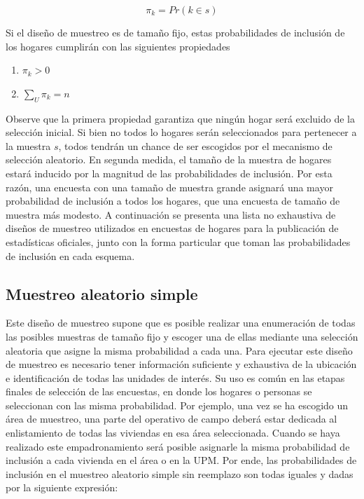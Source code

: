 \documentclass[
  12pt,
  spanish,
]{book}
\providecommand{\tightlist}{%
  \setlength{\itemsep}{0pt}\setlength{\parskip}{0pt}}
\begin{document}
\[\pi_k = Pr (k \in s)\]

Si el diseño de muestreo es de tamaño fijo, estas probabilidades de inclusión de los hogares cumplirán con las siguientes propiedades

\begin{enumerate}
\def\labelenumi{\arabic{enumi}.}
\tightlist
\item
  \(\pi_k > 0\)
\item
  \(\sum_U \pi_k = n\)
\end{enumerate}

Observe que la primera propiedad garantiza que ningún hogar será excluido de la selección inicial. Si bien no todos lo hogares serán seleccionados para pertenecer a la muestra \(s\), todos tendrán un chance de ser escogidos por el mecanismo de selección aleatorio. En segunda medida, el tamaño de la muestra de hogares estará inducido por la magnitud de las probabilidades de inclusión. Por esta razón, una encuesta con una tamaño de muestra grande asignará una mayor probabilidad de inclusión a todos los hogares, que una encuesta de tamaño de muestra más modesto. A continuación se presenta una lista no exhaustiva de diseños de muestreo utilizados en encuestas de hogares para la publicación de estadísticas oficiales, junto con la forma particular que toman las probabilidades de inclusión en cada esquema.

\hypertarget{muestreo-aleatorio-simple}{%
\subsection*{Muestreo aleatorio simple}\label{muestreo-aleatorio-simple}}

Este diseño de muestreo supone que es posible realizar una enumeración de todas las posibles muestras de tamaño fijo y escoger una de ellas mediante una selección aleatoria que asigne la misma probabilidad a cada una. Para ejecutar este diseño de muestreo es necesario tener información suficiente y exhaustiva de la ubicación e identificación de todas las unidades de interés. Su uso es común en las etapas finales de selección de las encuestas, en donde los hogares o personas se seleccionan con las misma probabilidad. Por ejemplo, una vez se ha escogido un área de muestreo, una parte del operativo de campo deberá estar dedicada al enlistamiento de todas las viviendas en esa área seleccionada. Cuando se haya realizado este empadronamiento será posible asignarle la misma probabilidad de inclusión a cada vivienda en el área o en la UPM. Por ende, las probabilidades de inclusión en el muestreo aleatorio simple sin reemplazo son todas iguales y dadas por la siguiente expresión:
\end{document}
